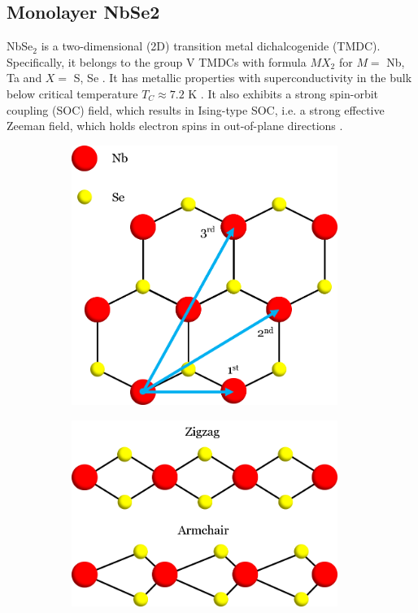\documentclass[12pt]{report} %
\begin{document}
\subsection*{Monolayer NbSe2}
  NbSe$_2$ is a two-dimensional (2D) transition metal dichalcogenide (TMDC). Specifically, it belongs to the group V TMDCs with formula $MX_2$ for $M =$ Nb, Ta and $X =$ S, Se \cite{Eui-Hyeok2020}. It has metallic properties with superconductivity in the bulk below critical temperature $T_C \approx 7.2$ K \cite{Xi2016}. It also exhibits a strong spin-orbit coupling (SOC) field, which results in Ising-type SOC, i.e. a strong effective Zeeman field, which holds electron spins in out-of-plane directions \cite{Xi2016}.
%
\begin{figure}[t]
\centering
  \begin{subfigure}[c]{0.475\textwidth}
    \centering
    \includegraphics[width=0.95\textwidth]{NbSe_top.png}
    \caption{
    }
  \end{subfigure}
  \hfill
  \begin{subfigure}[c]{0.475\textwidth}
    \centering
    \includegraphics[width=0.95\textwidth]{NbSe_side.png}

\end{subfigure}
\end{figure}
\end{document}
